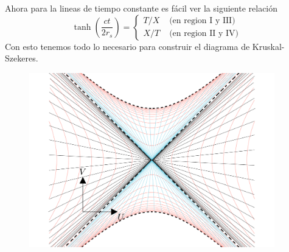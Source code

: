 \noindent Ahora para la lineas de tiempo constante es fácil ver la siguiente relación
\begin{equation}
    \tanh \left(\frac{ct}{2 r_s}\right)=\left\{\begin{array}{ll}
        T / X & \text { (en region I y III) } \\
        X / T & \text { (en region II y IV) }
        \end{array}\right.
\end{equation}
Con esto tenemos todo lo necesario para construir el diagrama de Kruskal-Szekeres.  
\begin{figure}[H]
    \begin{small}
        \begin{center}
            \includegraphics[width=0.95\textwidth]{AgujerosNegros/Schwarzschild/media/images/Kruskal_Szekeres_diagram_ManimCE_v0.19.0.png}
        \end{center}
        \caption{}
        \label{fig:}
    \end{small}
\end{figure}
